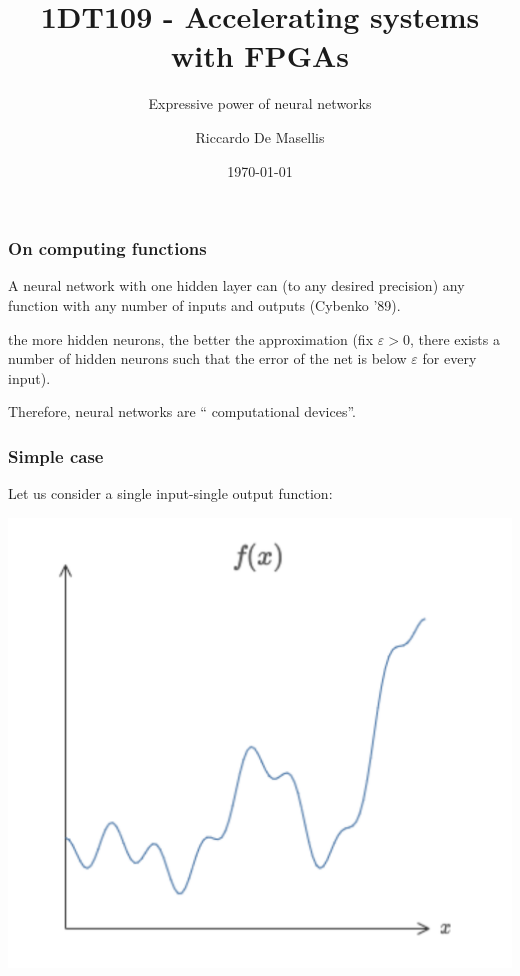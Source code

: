 \documentclass[usenames,dvipsnames]{beamer}
\title{1DT109 - Accelerating systems with FPGAs}
\subtitle{Expressive power of neural networks}
\author[R.\ De Masellis]{Riccardo De Masellis}
\date[]{\today}
\institute[uu.se]{Uppsala University}
\begin{document}
\begin{frame}[plain]
  \titlepage
\end{frame}
\begin{frame}
  \frametitle{On computing functions}


\begin{ntblock}
\centering
A neural network with one hidden layer can  (to any desired precision) any  function with any number of inputs and outputs (Cybenko '89).
\end{ntblock}

\pause

  the more hidden neurons, the better the approximation (fix $\varepsilon > 0$, there exists a number of hidden neurons such that the error of the net is below $\varepsilon$ for every input).

\vfill \pause

\begin{ntblock}
\centering
Therefore, neural networks are `` computational devices''.
\end{ntblock}

\end{frame}


\begin{frame}
  \frametitle{Simple case}
  
  Let us consider a single input-single output function:
  
  \centering
  \includegraphics[scale=.3]{cont-func}
\end{frame}
\end{document}
